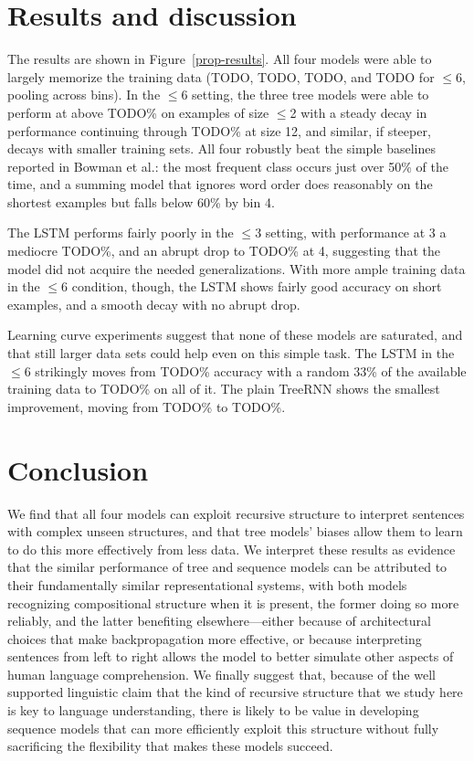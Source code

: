 \section{Results and discussion}\label{sec:discussion}

The results are shown in Figure~\ref{prop-results}. All four models were able to largely memorize the training data (TODO, TODO, TODO, and TODO for $\le$6, pooling across bins). In the $\le$6 setting, the three tree models were able to perform at above TODO\% on examples of size $\le$2 with a steady decay in performance continuing through TODO\% at size 12, and similar, if steeper, decays with smaller training sets. All four robustly beat the simple baselines reported in Bowman et al.: the most frequent class occurs just over 50\% of the time, and a summing model that ignores word order does reasonably on the shortest examples but falls below 60\% by bin 4.

The LSTM performs fairly poorly in the $\le3$ setting, with performance at 3 a mediocre TODO\%, and an abrupt drop to TODO\% at 4, suggesting that the model did not acquire the needed generalizations. With more ample training data in the $\le6$ condition, though, the LSTM shows fairly good accuracy on short examples, and a smooth decay with no abrupt drop. 

Learning curve experiments suggest that none of these models are saturated, and that still larger data sets could help even on this simple task. The LSTM in the $\le6$ strikingly moves from TODO\% accuracy with a random 33\% of the available training data to TODO\% on all of it. The plain TreeRNN shows the smallest improvement, moving from TODO\% to TODO\%.

\section{Conclusion}

We find that all four models can exploit recursive structure to interpret sentences with complex unseen structures, and that tree models' biases allow them to learn to do this more effectively from less data. 
We interpret these results as evidence that the similar performance of tree and sequence models can be attributed to their fundamentally similar representational systems, with both models recognizing compositional structure when it is present, the former doing so more reliably, and the latter benefiting elsewhere---either because of architectural choices that make backpropagation more effective, or because interpreting sentences from left to right allows the model to better simulate other aspects of human language comprehension. We finally suggest that, because of the well supported linguistic claim that the kind of recursive structure that we study here is key to language understanding, there is likely to be value in developing sequence models that can more efficiently exploit this structure without fully sacrificing the flexibility that makes these models succeed.
